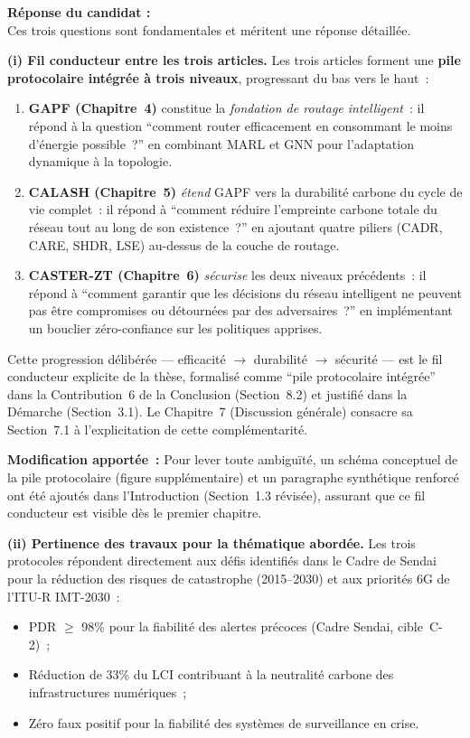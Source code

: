 \documentclass[12pt,a4paper]{article}
\newcommand{\Reponse}[1]{%
  \begin{responsebox}
    \textbf{Réponse du candidat :}\\#1
  \end{responsebox}%
}
\begin{document}
\Reponse{
Ces trois questions sont fondamentales et méritent une réponse détaillée.

\textbf{(i) Fil conducteur entre les trois articles.}
Les trois articles forment une \textbf{pile protocolaire intégrée à trois niveaux}, progressant du bas vers le haut~:
\begin{enumerate}[leftmargin=*, label=\arabic*.]
  \item \textbf{GAPF (Chapitre~4)} constitue la \emph{fondation de routage intelligent}~: il répond à la question ``comment router efficacement en consommant le moins d'énergie possible~?'' en combinant MARL et GNN pour l'adaptation dynamique à la topologie.
  \item \textbf{CALASH (Chapitre~5)} \emph{étend} GAPF vers la durabilité carbone du cycle de vie complet~: il répond à ``comment réduire l'empreinte carbone totale du réseau tout au long de son existence~?'' en ajoutant quatre piliers (CADR, CARE, SHDR, LSE) au-dessus de la couche de routage.
  \item \textbf{CASTER-ZT (Chapitre~6)} \emph{sécurise} les deux niveaux précédents~: il répond à ``comment garantir que les décisions du réseau intelligent ne peuvent pas être compromises ou détournées par des adversaires~?'' en implémentant un bouclier zéro-confiance sur les politiques apprises.
\end{enumerate}
Cette progression délibérée --- efficacité $\rightarrow$ durabilité $\rightarrow$ sécurité --- est le fil conducteur explicite de la thèse, formalisé comme ``pile protocolaire intégrée'' dans la Contribution~6 de la Conclusion (Section~8.2) et justifié dans la Démarche (Section~3.1). Le Chapitre~7 (Discussion générale) consacre sa Section~7.1 à l'explicitation de cette complémentarité.

\textbf{Modification apportée~:} Pour lever toute ambiguïté, un schéma conceptuel de la pile protocolaire (figure supplémentaire) et un paragraphe synthétique renforcé ont été ajoutés dans l'Introduction (Section~1.3 révisée), assurant que ce fil conducteur est visible dès le premier chapitre.

\textbf{(ii) Pertinence des travaux pour la thématique abordée.}
Les trois protocoles répondent directement aux défis identifiés dans le Cadre de Sendai pour la réduction des risques de catastrophe (2015--2030) et aux priorités 6G de l'ITU-R IMT-2030~:
\begin{itemize}[leftmargin=*]
  \item PDR $\geq$ 98\% pour la fiabilité des alertes précoces (Cadre Sendai, cible~C-2)~;
  \item Réduction de 33\% du LCI contribuant à la neutralité carbone des infrastructures numériques~;
  \item Zéro faux positif pour la fiabilité des systèmes de surveillance en crise.
\end{itemize}

}
\end{document}
